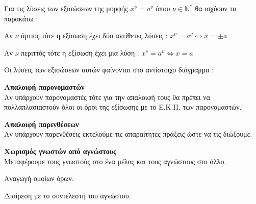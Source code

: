 Για τις λύσεις των εξισώσεων της μορφής $ x^\nu=a^\nu $ όπου $ \nu\in\mathbb{N^*} $ θα ισχύουν τα παρακάτω :
\begin{rlist}
\item Αν $ \nu $ άρτιος τότε η εξίσωση έχει δύο αντίθετες λύσεις : $ x^\nu=a^\nu\Leftrightarrow x=\pm a $
\item Αν $ \nu $ περιττός τότε η εξίσωση έχει μια λύση : $ x^\nu=a^\nu\Leftrightarrow x=a $
\end{rlist}
Οι λύσεις των εξισώσεων αυτών φαίνονται στο αντίστοιχο διάγραμμα :
\begin{center}
\end{center}
\newpage
\Lymena
\begin{Methodos}{9cm}
\begin{bhma}
\item\textbf{Απαλοιφή παρονομαστών}\\
Αν υπάρχουν παρονομαστές τότε για την απαλοιφή τους θα πρέπει να πολλαπλασιαστούν όλοι οι όροι της εξίσωσης με το Ε.Κ.Π. των παρονομαστών.	
\item \textbf{Απαλοιφή παρενθέσεων}\\
Aν υπάρχουν παρενθέσεις εκτελούμε τις απαραίτητες πράξεις ώστε να τις διώξουμε.
\item \textbf{Χωρισμός γνωστών από αγνώστους}\\
Μεταφέρουμε τους γνωστούς στο ένα μέλος και τους αγνώστους στο άλλο.
\item Αναγωγή ομοίων όρων.
\item Διαίρεση με το συντελεστή του αγνώστου.	
\end{bhma}
\end{Methodos}
